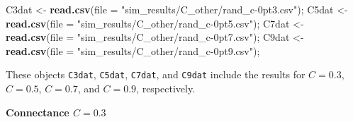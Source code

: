 \documentclass[]{article}
\newenvironment{Shaded}{\begin{snugshade}}{\end{snugshade}}
\newcommand{\KeywordTok}[1]{\textcolor[rgb]{0.13,0.29,0.53}{\textbf{{#1}}}}
\newcommand{\DataTypeTok}[1]{\textcolor[rgb]{0.13,0.29,0.53}{{#1}}}
\newcommand{\StringTok}[1]{\textcolor[rgb]{0.31,0.60,0.02}{{#1}}}
\newcommand{\NormalTok}[1]{{#1}}
\begin{document}
\begin{Shaded}
\begin{Highlighting}[]
\NormalTok{C3dat <-}\StringTok{ }\KeywordTok{read.csv}\NormalTok{(}\DataTypeTok{file =} \StringTok{"sim_results/C_other/rand_c-0pt3.csv"}\NormalTok{);}
\NormalTok{C5dat <-}\StringTok{ }\KeywordTok{read.csv}\NormalTok{(}\DataTypeTok{file =} \StringTok{"sim_results/C_other/rand_c-0pt5.csv"}\NormalTok{);}
\NormalTok{C7dat <-}\StringTok{ }\KeywordTok{read.csv}\NormalTok{(}\DataTypeTok{file =} \StringTok{"sim_results/C_other/rand_c-0pt7.csv"}\NormalTok{);}
\NormalTok{C9dat <-}\StringTok{ }\KeywordTok{read.csv}\NormalTok{(}\DataTypeTok{file =} \StringTok{"sim_results/C_other/rand_c-0pt9.csv"}\NormalTok{);}
\end{Highlighting}
\end{Shaded}

These objects \texttt{C3dat}, \texttt{C5dat}, \texttt{C7dat}, and
\texttt{C9dat} include the results for \(C = 0.3\), \(C = 0.5\),
\(C = 0.7\), and \(C = 0.9\), respectively.

\textbf{Connectance \(C = 0.3\)}
\end{document}

